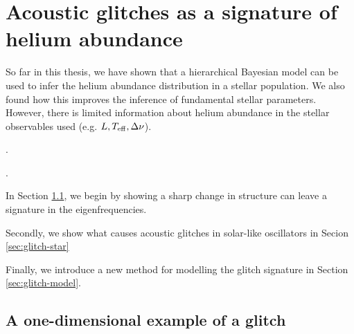 %
%
%
%
%
\chapter[Acoustic glitches]{Acoustic glitches as a signature of helium abundance}\label{chap:glitch}

So far in this thesis, we have shown that a hierarchical Bayesian model can be used to infer the helium abundance distribution in a stellar population. We also found how this improves the inference of fundamental stellar parameters. However, there is limited information about helium abundance in the stellar observables used (e.g. \(L, T_\mathrm{eff}, \Delta\nu\)).

.

.

In Section \ref{sec:1d-glitch}, we begin by showing a sharp change in structure can leave a signature in the eigenfrequencies.

Secondly, we show what causes acoustic glitches in solar-like oscillators in Secion \ref{sec:glitch-star}

Finally, we introduce a new method for modelling the glitch signature in Section \ref{sec:glitch-model}. 

\section[1D example]{A one-dimensional example of a glitch}\label{sec:1d-glitch}


